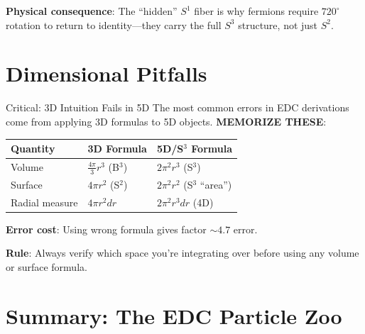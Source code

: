 \textbf{Physical consequence}: The ``hidden'' $S^1$ fiber is why fermions
require $720^\circ$ rotation to return to identity---they carry the full $S^3$
structure, not just $S^2$.

\section{Dimensional Pitfalls}
\label{sec:dimensional_pitfalls}

\begin{warningbox}{Critical: 3D Intuition Fails in 5D}
The most common errors in EDC derivations come from applying 3D formulas
to 5D objects. \textbf{MEMORIZE THESE}:

\begin{center}
\begin{tabular}{lll}
\toprule
\textbf{Quantity} & \textbf{3D Formula} & \textbf{5D/S$^3$ Formula} \\
\midrule
Volume & $\frac{4\pi}{3}r^3$ (B$^3$) & $2\pi^2 r^3$ (S$^3$) \\
Surface & $4\pi r^2$ (S$^2$) & $2\pi^2 r^2$ (S$^3$ ``area'') \\
Radial measure & $4\pi r^2 dr$ & $2\pi^2 r^3 dr$ (4D) \\
\bottomrule
\end{tabular}
\end{center}

\textbf{Error cost}: Using wrong formula gives factor $\sim 4.7$ error.
\end{warningbox}

\textbf{Rule}: Always verify which space you're integrating over before
using any volume or surface formula.

\section{Summary: The EDC Particle Zoo}
\label{sec:ontology_summary}

